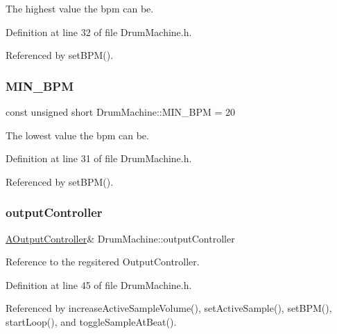The highest value the bpm can be. 



Definition at line 32 of file Drum\+Machine.\+h.



Referenced by set\+B\+P\+M().

\mbox{\label{class_drum_machine_a221c0cd8b5cf3f2342f57ad539d3628a}} 
\subsubsection{\texorpdfstring{M\+I\+N\+\_\+\+B\+PM}{MIN\_BPM}}
{\footnotesize\ttfamily const unsigned short Drum\+Machine\+::\+M\+I\+N\+\_\+\+B\+PM = 20\hspace{0.3cm}{\ttfamily [private]}}



The lowest value the bpm can be. 



Definition at line 31 of file Drum\+Machine.\+h.



Referenced by set\+B\+P\+M().

\mbox{\label{class_drum_machine_a4a5b4d6cc6e4a3ce2c2893e52fd0e951}} 
\subsubsection{\texorpdfstring{output\+Controller}{outputController}}
{\footnotesize\ttfamily \hyperlink{class_a_output_controller}{A\+Output\+Controller}\& Drum\+Machine\+::output\+Controller\hspace{0.3cm}{\ttfamily [private]}}



Reference to the regsitered Output\+Controller. 



Definition at line 45 of file Drum\+Machine.\+h.



Referenced by increase\+Active\+Sample\+Volume(), set\+Active\+Sample(), set\+B\+P\+M(), start\+Loop(), and toggle\+Sample\+At\+Beat().

